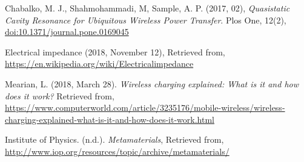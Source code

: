 \documentclass[]{article}
\begin{document}
\begin{thebibliography}{999}
	\raggedright
	Chabalko, M. J., Shahmohammadi, M, Sample, A. P.
	(2017, 02),
	\emph{Quasistatic Cavity Resonance for Ubiquitous Wireless Power Transfer}.
	Plos One, 12(2), 
	\url{doi:10.1371/journal.pone.0169045}
	
	\raggedright
	Electrical impedance
	(2018, November 12),
	Retrieved from,
    \url{https://en.wikipedia.org/wiki/Electricalimpedance}
    
    \raggedright
    Mearian, L.
    (2018, March 28).
    \emph{Wireless charging explained: What is it and how does it work?}
    Retrieved from,
    \url{https://www.computerworld.com/article/3235176/mobile-wireless/wireless-charging-explained-what-is-it-and-how-does-it-work.html}
    
    \raggedright
    Institute of Physics.
    (n.d.).
    \emph{Metamaterials},
    Retrieved from,
    \url{http://www.iop.org/resources/topic/archive/metamaterials/}
	
\end{thebibliography}
\end{document}
